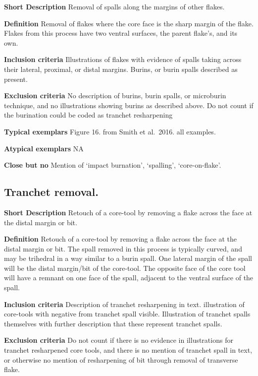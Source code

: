 \documentclass[
]{article}
\begin{document}
\textbf{Short Description} Removal of spalls along the margins of other
flakes.

\textbf{Definition} Removal of flakes where the core face is the sharp
margin of the flake. Flakes from this process have two ventral surfaces,
the parent flake's, and its own.

\textbf{Inclusion criteria} Illustrations of flakes with evidence of
spalls taking across their lateral, proximal, or distal margins. Burins,
or burin spalls described as present.

\textbf{Exclusion criteria} No description of burins, burin spalls, or
microburin technique, and no illustrations showing burins as described
above. Do not count if the burination could be coded as tranchet
resharpening

\textbf{Typical exemplars} Figure 16. from Smith et al.~2016. all
examples.

\textbf{Atypical exemplars} NA

\textbf{Close but no} Mention of `impact burnation', `spalling',
`core-on-flake'.

\hypertarget{tranchet-removal.}{%
\subsection{Tranchet removal.}\label{tranchet-removal.}}

\textbf{Short Description} Retouch of a core-tool by removing a flake
across the face at the distal margin or bit.

\textbf{Definition} Retouch of a core-tool by removing a flake across
the face at the distal margin or bit. The spall removed in this process
is typically curved, and may be trihedral in a way similar to a burin
spall. One lateral margin of the spall will be the distal margin/bit of
the core-tool. The opposite face of the core tool will have a remnant on
one face of the spall, adjacent to the ventral surface of the spall.

\textbf{Inclusion criteria} Description of tranchet resharpening in
text. illustration of core-tools with negative from tranchet spall
visible. Illustration of tranchet spalls themselves with further
description that these represent tranchet spalls.

\textbf{Exclusion criteria} Do not count if there is no evidence in
illustrations for tranchet resharpened core tools, and there is no
mention of tranchet spall in text, or otherwise no mention of
resharpening of bit through removal of transverse flake.
\end{document}
